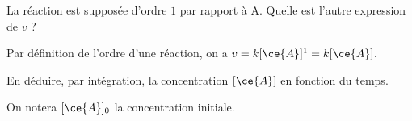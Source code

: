 

\finEntrainement






\hauteurLargeurCadreReponse		{7mm}{4cm}
\initialisationEntrainement

\debutEntrainement



\begin{enonce}
La réaction est supposée d'ordre $1$ par rapport à A. 
Quelle est l'autre expression de $v$ ?

\end{enonce}


\begin{corrige}
Par définition de l'ordre d'une réaction, on a $v= k[\ce{A}]^1 = k[\ce{A}]$.
\end{corrige}




\begin{enonce}
En déduire, par intégration, la concentration $[\ce{A}]$ en fonction du temps.

On notera $[\ce{A}]_0$ la concentration initiale.
\minusBigskip

\end{enonce}

